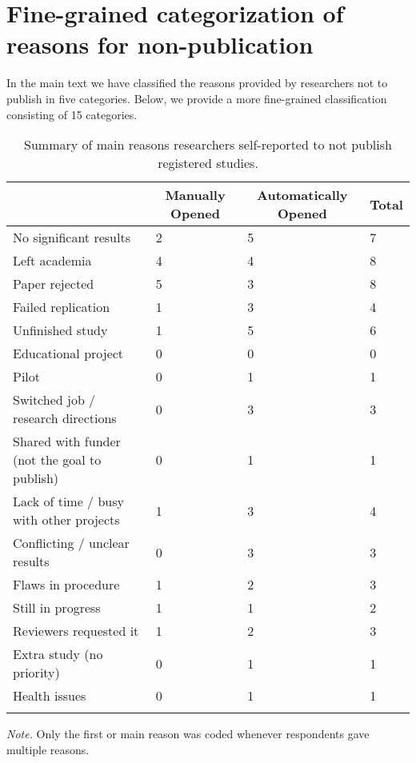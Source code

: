 \documentclass[
  ,jou, a4paper,floatsintext]{apa6}
\begin{document}
\hypertarget{fine-grained-categorization-of-reasons-for-non-publication}{%
\section{Fine-grained categorization of reasons for non-publication}\label{fine-grained-categorization-of-reasons-for-non-publication}}

In the main text we have classified the reasons provided by researchers not to publish in five categories. Below, we provide a more fine-grained classification consisting of 15 categories.

\begin{table*}[tbp]

\begin{center}
\begin{threeparttable}

\caption{\label{tab:reasons_non_publish}Summary of main reasons researchers self-reported to not publish registered studies.}

\begin{tabular}{llll}
\toprule
 & \multicolumn{1}{c}{Manually Opened} & \multicolumn{1}{c}{Automatically Opened} & \multicolumn{1}{c}{Total}\\
\midrule
No significant results & 2 & 5 & 7\\
Left academia & 4 & 4 & 8\\
Paper rejected & 5 & 3 & 8\\
Failed replication & 1 & 3 & 4\\
Unfinished study & 1 & 5 & 6\\
Educational project & 0 & 0 & 0\\
Pilot & 0 & 1 & 1\\
Switched job / research directions & 0 & 3 & 3\\
Shared with funder (not the goal to publish) & 0 & 1 & 1\\
Lack of time / busy with other projects & 1 & 3 & 4\\
Conflicting / unclear results & 0 & 3 & 3\\
Flaws in procedure & 1 & 2 & 3\\
Still in progress & 1 & 1 & 2\\
Reviewers requested it & 1 & 2 & 3\\
Extra study (no priority) & 0 & 1 & 1\\
Health issues & 0 & 1 & 1\\
\bottomrule
\addlinespace
\end{tabular}

\begin{tablenotes}[para]
\normalsize{\textit{Note.} Only the first or main reason was coded whenever respondents gave multiple reasons.}
\end{tablenotes}

\end{threeparttable}
\end{center}

\end{table*}
\end{document}
